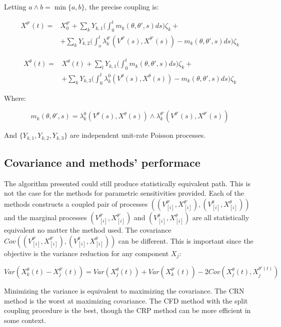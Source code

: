 	Letting $a\land b = \min\{a, b\}$, the precise coupling is:

	\begin{align*}
		X^{\theta'}(t) = &X_0^{\theta'} + \sum\limits_kY_{k, 1}\biggl(\int_0^tm_k(\theta, \theta', s)ds\biggr)\zeta_k+\\
										 &+\sum\limits_{k}Y_{k, 2}\biggl(\int_o^t\lambda_k^{\theta'}(V^{\theta'}(s), X^{\theta'}(s))-m_k(\theta, \theta', s)ds\biggr)\zeta_k
	\end{align*}

	\begin{align*}
		X^\theta(t) = &X^\theta(t) + \sum\limits_{l}Y_{k,1}\biggl(\int_0^tm_k(\theta, \theta', s)ds\biggr)\zeta_k+\\
									&+\sum\limits_kY_{k, 3}\biggl(\int_0^t\lambda_k^0(V^\theta(s), X^\theta(s))-m_k(\theta, \theta', s)ds\biggr)\zeta_k
	\end{align*}

	Where:

	$$m_k(\theta, \theta', s) = \lambda_k^0(V^\theta(s), X^\theta(s))\land\lambda_k^{\theta'}(V^{\theta'}(s), X^{\theta'}(s))$$

	And $\{Y_{k, 1}, Y_{k, 2}, Y_{k, 3}\}$ are independent unit-rate Poisson processes.

	\subsection{Covariance and methods' performace}
	The algorithm presented could still produce statistically equivalent path.
	This is not the case for the methods for parametric sensitivities provided.
	Each of the methods constructs a coupled pair of processes $((V_{[i]}^{\theta'}, X_{[i]}^{\theta'}),(V_{[i]}^\theta, X_{[i]}^{\theta}))$  and the marginal processes $(V_{[i]}^{\theta'}, X_{[i]}^{\theta'})$ and $(V_{[i]}^\theta, X_{[i]}^{\theta})$ are all statistically equivalent no matter the method used.
	The covariance $Cov((V_{[i]}^{\theta'}, X_{[i]}^{\theta'}),(V_{[i]}^\theta, X_{[i]}^{\theta}))$  can be different.
	This is important since the objective is the variance reduction for any component $X_j$:

	$$Var(X_k^\theta(t)-X_j^{\theta'}(t)) = Var(X_j^\theta(t))+Var(X_k^{\theta'}(t))-2Cov(X_j^\theta(t), X_j^{\theta'(t)})$$

	Minimizing the variance is equivalent to maximizing the covariance.
	The CRN method is the worst at maximizing covariance.
	The CFD method with the split coupling procedure is the best, though the CRP method can be more efficient in some context.

